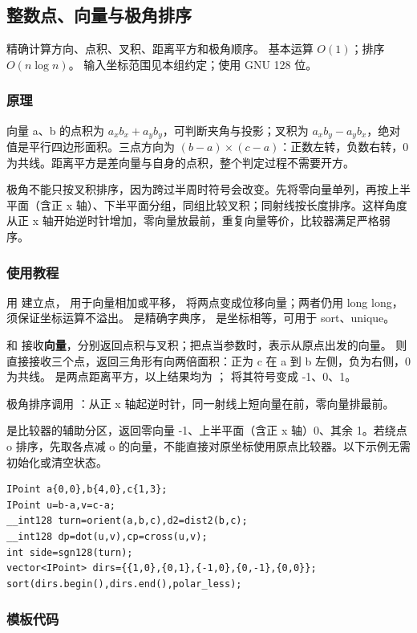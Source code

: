 \subsection{整数点、向量与极角排序}
\label{geo:integer-point}
\AlgorithmInfo
    {精确计算方向、点积、叉积、距离平方和极角顺序。}
    {基本运算 $O(1)$；排序 $O(n\log n)$。}
    {输入坐标范围见本组约定；使用 GNU 128 位。}
\subsubsection*{原理}

向量 a、b 的点积为 $a_xb_x+a_yb_y$，可判断夹角与投影；叉积为 $a_xb_y-a_yb_x$，绝对值是平行四边形面积。三点方向为 $(b-a)\times(c-a)$：正数左转，负数右转，0 为共线。距离平方是差向量与自身的点积，整个判定过程不需要开方。

极角不能只按叉积排序，因为跨过半周时符号会改变。先将零向量单列，再按上半平面（含正 x 轴）、下半平面分组，同组比较叉积；同射线按长度排序。这样角度从正 x 轴开始逆时针增加，零向量放最前，重复向量等价，比较器满足严格弱序。

\subsubsection*{使用教程}
用  建立点，\InlineCode{+} 用于向量相加或平移，\InlineCode{-} 将两点变成位移向量；两者仍用 long long，须保证坐标运算不溢出。\InlineCode{<} 是精确字典序，\InlineCode{==} 是坐标相等，可用于 sort、unique。

 和  接收\textbf{向量}，分别返回点积与叉积；把点当参数时，表示从原点出发的向量。 则直接接收三个点，返回三角形有向两倍面积：正为 c 在 a 到 b 左侧，负为右侧，0 为共线。 是两点距离平方，以上结果均为 ； 将其符号变成 -1、0、1。

极角排序调用 ：从正 x 轴起逆时针，同一射线上短向量在前，零向量排最前。

 是比较器的辅助分区，返回零向量 -1、上半平面（含正 x 轴）0、其余 1。若绕点 o 排序，先取各点减 o 的向量，不能直接对原坐标使用原点比较器。以下示例无需初始化或清空状态。
\begin{lstlisting}[style=mtycpp,numbers=none]
IPoint a{0,0},b{4,0},c{1,3};
IPoint u=b-a,v=c-a;
__int128 turn=orient(a,b,c),d2=dist2(b,c);
__int128 dp=dot(u,v),cp=cross(u,v);
int side=sgn128(turn);
vector<IPoint> dirs={{1,0},{0,1},{-1,0},{0,-1},{0,0}};
sort(dirs.begin(),dirs.end(),polar_less);
\end{lstlisting}
\subsubsection*{模板代码}
